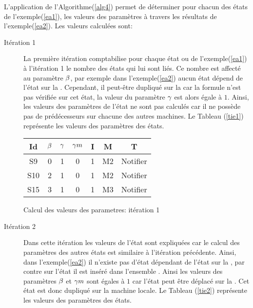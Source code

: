 \begin{Exemple}\label{ea3}
	L'application de l'Algorithme(\ref{alg4}) permet de déterminer pour chacun des états de l'exemple(\ref{ea1}), les valeurs des paramètres à travers les résultats de l'exemple(\ref{ea2}). Les valeurs calculées sont: 
	
\begin{description}
	\item[Itération 1] La première itération comptabilise pour chaque état  ou  de l'exemple(\ref{ea1}) à l'itération 1 le nombre des états  qui lui sont liés. Ce nombre est affecté au paramètre  $\beta{}$, par exemple dans l'exemple(\ref{ea2}) aucun état dépend de l'état  sur la \mtwo{}. Cependant, il peut-être dupliqué sur la \mone{} car la formule n'est pas vérifiée sur cet état, la valeur du paramètre $\gamma{}$  est alors égale à $1$. Ainsi, les valeurs des paramètres de l'état  ne sont pas calculés car il ne possède pas de prédécesseurs sur chacune des autres machines.
Le Tableau (\ref{tie1}) représente les valeurs des paramètres  des états.	
\begin{tableth}
	\centering
	\begin{tabular}{|*{7}{c|}}
		\hline
		Id&$\beta{}$&	$\gamma{}$	&$\gamma m{}$ &	I&	M&	T\\ \hline
		S9&		0&	1	&0&	1&	M2&	Notifier\\ \hline
		S10&	2&	1	&0&	1&	M2&	Notifier\\ \hline
		S15&	3&	1	&0&	1&	M3&	Notifier\\ \hline		
	\end{tabular}
	\caption{Calcul des valeurs des parametres: itération 1}\label{tie1}
\end{tableth}
\item[Itération 2] Dans cette itération les valeurs de l'état  sont expliquées car le calcul des paramètres des autres états est similaire à l'itération précédente. Ainsi, dans l'exemple(\ref{ea2}) il n'existe pas d'état dépendant de l'état  sur la \mtwo{}, par contre sur l'état  il est inséré dans l'ensemble . Ainsi les valeurs des paramètres $\beta{}$ et $\gamma m{}$  sont égales à $1$ car l'état  peut être déplacé sur la \mtwo{}. Cet état est donc dupliqué sur la machine locale. 
Le Tableau (\ref{tie2}) représente les valeurs des paramètres  des états.
\begin{tableth}
	\centering
	\begin{tabular}{|*{7}{c|}}

\end{tabular}
\end{tableth}
\end{description}
\end{Exemple}
